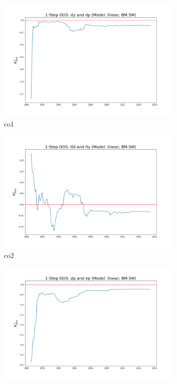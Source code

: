 \documentclass[a4paper,12pt,times,numbered,print,index]{report}
\numberwithin{equation}{section}
\begin{document}
\begin{figure}[!htbp]
	\centering
	\caption{OOS Results for Model with $g_8$}
	\begin{subfigure}[b]{0.42\linewidth}
		\includegraphics[width=0.9\linewidth]{OOS_plots/linear_co1_SM.png}
		\caption{co1}
	\end{subfigure}
	\begin{subfigure}[b]{0.42\linewidth}
		\includegraphics[width=0.9\linewidth]{OOS_plots/linear_co2_SM.png}
		\caption{co2}
	\end{subfigure}
	\begin{subfigure}[b]{0.42\linewidth}
		\includegraphics[width=0.9\linewidth]{OOS_plots/linear_co3_SM.png}

\end{subfigure}
\end{figure}
\end{document}
